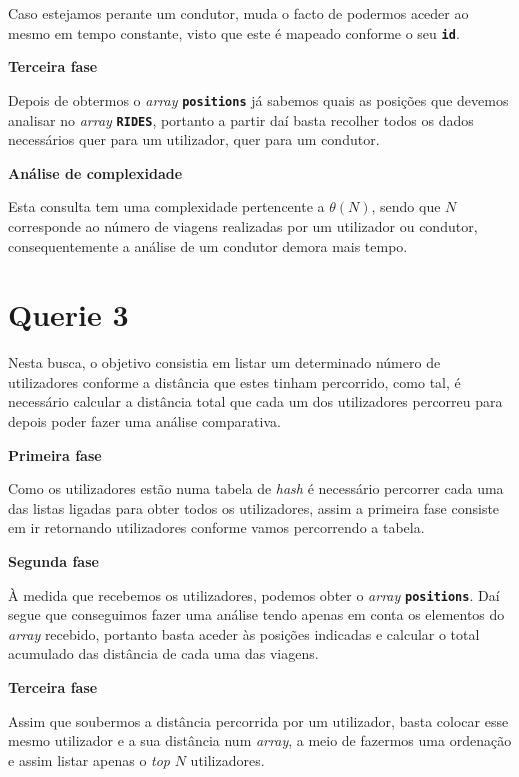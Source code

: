 \documentclass[12pt,a4paper]{report}
\begin{document}
Caso estejamos perante um condutor, muda o facto de podermos aceder ao mesmo em tempo constante, visto que este é mapeado conforme o seu \textbf{\small\texttt{id}}.

\normalsize\textbf{Terceira fase }{\titlerule[0.5pt]}

Depois de obtermos o \textit{array} \textbf{\small\texttt{positions}} já sabemos quais as posições que devemos analisar no \textit{array} \textbf{\small\texttt{RIDES}}, portanto a partir daí basta recolher todos os dados necessários quer para um utilizador, quer para um condutor.

\normalsize\textbf{Análise de complexidade }{\titlerule[0.5pt]}

Esta consulta tem uma complexidade pertencente a \(\theta(N)\), sendo que \(N\) corresponde ao número de viagens realizadas por um utilizador ou condutor, consequentemente a análise de um condutor demora mais tempo.

\vspace{-6pt}
\section{Querie 3}

Nesta busca, o objetivo consistia em listar um determinado número de utilizadores conforme a distância que estes tinham percorrido, como tal, é necessário calcular a distância total que cada um dos utilizadores percorreu para depois poder fazer uma análise comparativa.

\normalsize\textbf{Primeira fase }{\titlerule[0.5pt]}

Como os utilizadores estão numa tabela de \textit{hash} é necessário percorrer cada uma das listas ligadas para obter todos os utilizadores, assim a primeira fase consiste em ir retornando utilizadores conforme vamos percorrendo a tabela.

\normalsize\textbf{Segunda fase }{\titlerule[0.5pt]}

À medida que recebemos os utilizadores, podemos obter o \textit{array} \textbf{\small\texttt{positions}}. Daí segue que conseguimos fazer uma análise tendo apenas em conta os elementos do \textit{array} recebido, portanto basta aceder às posições indicadas e calcular o total acumulado das distância de cada uma das viagens.

\normalsize\textbf{Terceira fase }{\titlerule[0.5pt]}

Assim que soubermos a distância percorrida por um utilizador, basta colocar esse mesmo utilizador e a sua distância num \textit{array}, a meio de fazermos uma ordenação e assim listar apenas o \textit{top} \(N\) utilizadores.
\end{document}
